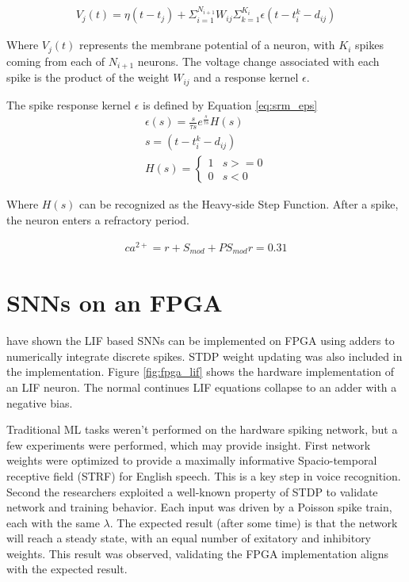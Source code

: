     \begin{align}
        V_j(t) = \eta(t - t_j) + \Sigma^{N_{i+1}}_{i=1}W_{ij}\Sigma^{K_i}_{k=1}
        \epsilon(t - t_i^k - d_{ij})
    \end{align}
    
    Where $V_j(t)$ represents the membrane potential of a neuron, with $K_i$
    spikes coming from each of $N_{i+1}$ neurons. The voltage change associated
    with each spike is the product of the weight $W_{ij}$ and a response kernel
    $\epsilon$.
    
    
    The spike response kernel $\epsilon$ is defined by Equation \ref{eq:srm_eps}
    \begin{align}
        \epsilon (s) = \frac{s}{\tau s} e^{\frac{s}{\tau s}}
        H(s) \label{eq:srm_eps} \\ s = (t - t_i^k - d_{ij}) \\ H(s) =
        \begin{cases} 
          1 & s >= 0 \\ 0 & s < 0
       \end{cases}
    \end{align}
    
    Where $H(s)$ can be recognized as the Heavy-side Step Function. After a
    spike, the neuron enters a refractory period.
        
    \begin{align}
        ca^{2+} = r + S_{mod} + PS_{mod} \label{eq:srm_astro_ca} r = 0.31
    \end{align}    
    
    \section{SNNs on an FPGA}
    \cite{cassidy_2017} have shown the LIF based SNNs can be implemented on FPGA
    using adders to numerically integrate discrete spikes. STDP weight updating
    was also included in the implementation. Figure \ref{fig:fpga_lif} shows the
    hardware implementation of an LIF neuron. The normal continues LIF equations
    collapse to an adder with a negative bias.
    
    
    Traditional ML tasks weren't performed on the hardware spiking network, but
    a few experiments were performed, which may provide insight. First network
    weights were optimized to provide a maximally informative Spacio-temporal
    receptive field (STRF) for English speech. This is a key step in voice
    recognition. Second the researchers exploited a well-known property of STDP
    to validate network and training behavior. Each input was driven by a
    Poisson spike train, each with the same $\lambda$. The expected result
    (after some time) is that the network will reach a steady state, with an
    equal number of exitatory and inhibitory weights. This result was observed,
    validating the FPGA implementation aligns with the expected result.
    
